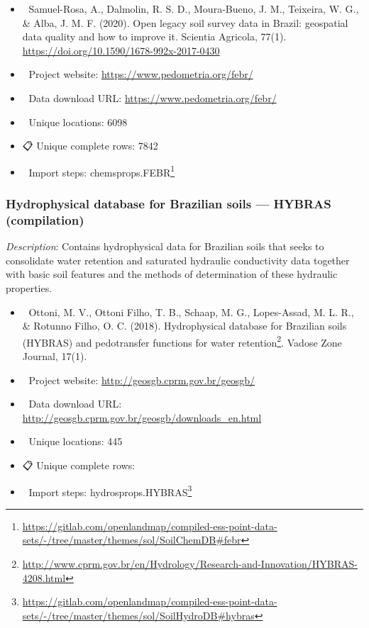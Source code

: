 \documentclass[
  graybox,natbib,nospthms]{svmono}
\providecommand{\tightlist}{%
  \setlength{\itemsep}{0pt}\setlength{\parskip}{0pt}}
\providecommand{\tightlist}{\setlength{\itemsep}{0pt}\setlength{\parskip}{0pt}}
\renewcommand{\href}[2]{#2 (\url{#1})}
\renewcommand{\href}[2]{#2\footnote{\url{#1}}}
\begin{document}
\begin{itemize}
\tightlist
\item
  📕 Samuel-Rosa, A., Dalmolin, R. S. D., Moura-Bueno, J. M., Teixeira, W. G., \& Alba, J. M. F. (2020). Open legacy soil survey data in Brazil: geospatial data quality and how to improve it. Scientia Agricola, 77(1). \url{https://doi.org/10.1590/1678-992x-2017-0430}\\
\item
  🔗 Project website: \url{https://www.pedometria.org/febr/}\\
\item
  📂 Data download URL: \url{https://www.pedometria.org/febr/}\\
\item
  📍 Unique locations: 6098\\
\item
  📋 Unique complete rows: 7842\\
\item
  📝 Import steps: \href{https://gitlab.com/openlandmap/compiled-ess-point-data-sets/-/tree/master/themes/sol/SoilChemDB\#febr}{chemsprops.FEBR}
\end{itemize}

\hypertarget{hydrophysical-database-for-brazilian-soils-hybras-compilation}{%
\subsubsection{Hydrophysical database for Brazilian soils --- HYBRAS (compilation)}\label{hydrophysical-database-for-brazilian-soils-hybras-compilation}}

\emph{Description}: Contains hydrophysical data for Brazilian soils that seeks to consolidate water retention and saturated hydraulic conductivity data together with basic soil features and the methods of determination of these hydraulic properties.

\begin{itemize}
\tightlist
\item
  📕 Ottoni, M. V., Ottoni Filho, T. B., Schaap, M. G., Lopes-Assad, M. L. R., \& Rotunno Filho, O. C. (2018). \href{http://www.cprm.gov.br/en/Hydrology/Research-and-Innovation/HYBRAS-4208.html}{Hydrophysical database for Brazilian soils (HYBRAS) and pedotransfer functions for water retention}. Vadose Zone Journal, 17(1).
\item
  🔗 Project website: \url{http://geosgb.cprm.gov.br/geosgb/}\\
\item
  📂 Data download URL: \url{http://geosgb.cprm.gov.br/geosgb/downloads_en.html}\\
\item
  📍 Unique locations: 445\\
\item
  📋 Unique complete rows:\\
\item
  📝 Import steps: \href{https://gitlab.com/openlandmap/compiled-ess-point-data-sets/-/tree/master/themes/sol/SoilHydroDB\#hybras}{hydrosprops.HYBRAS}
\end{itemize}
\end{document}
